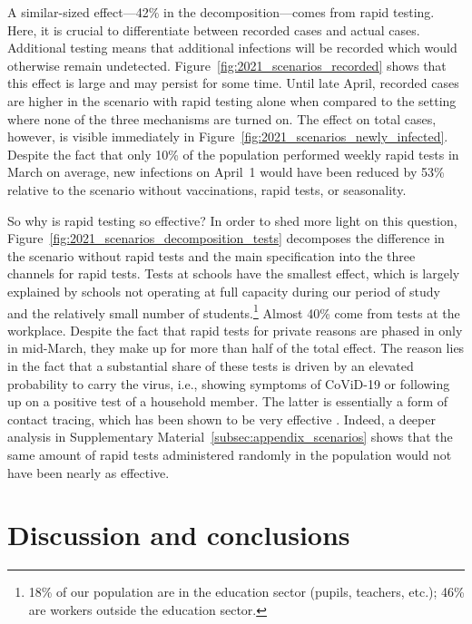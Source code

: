 A similar-sized effect---42\% in the decomposition---comes from rapid testing. Here, it
is crucial to differentiate between recorded cases and actual cases. Additional testing
means that additional infections will be recorded which would otherwise remain
undetected. Figure~\ref{fig:2021_scenarios_recorded} shows that this effect is large and
may persist for some time. Until late April, recorded cases are higher in the scenario
with rapid testing alone when compared to the setting where none of the three mechanisms
are turned on. The effect on total cases, however, is visible immediately in
Figure~\ref{fig:2021_scenarios_newly_infected}. Despite the fact that only 10\% of the
population performed weekly rapid tests in March on average, new infections on April~1
would have been reduced by 53\% relative to the scenario without vaccinations, rapid
tests, or seasonality.

So why is rapid testing so effective? In order to shed more light on this question,
Figure~\ref{fig:2021_scenarios_decomposition_tests} decomposes the difference in the
scenario without rapid tests and the main specification into the three channels for
rapid tests. Tests at schools have the smallest effect, which is largely explained by
schools not operating at full capacity during our period of study and the relatively
small number of students.\footnote{18\% of our population are in the education sector
    (pupils, teachers, etc.); 46\% are workers outside the education sector.} Almost 40\%
come from tests at the workplace. Despite the fact that rapid tests for private reasons
are phased in only in mid-March, they make up for more than half of the total effect.
The reason lies in the fact that a substantial share of these tests is driven by an
elevated probability to carry the virus, i.e., showing symptoms of CoViD-19 or following
up on a positive test of a household member. The latter is essentially a form of contact
tracing, which has been shown to be very effective \citep{Contreras2021,
    Fetzer2021,Kretzschmar2020}. Indeed, a deeper analysis in Supplementary
Material~\ref{subsec:appendix_scenarios} shows that the same amount of rapid tests
administered randomly in the population would not have been nearly as effective.


\section{Discussion and conclusions}

